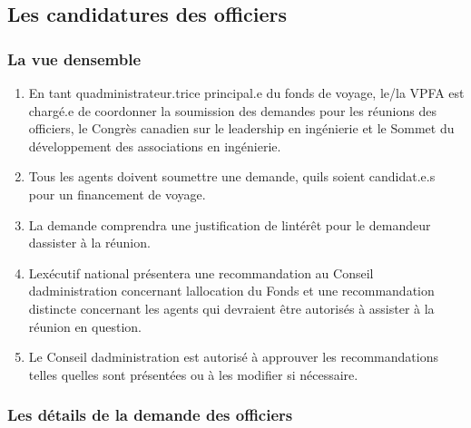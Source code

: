 \subsection{Les candidatures des officiers}
\label{les-candidatures-des-officiers}

\subsubsection{La vue d\textquotesingle ensemble}
\label{la-vue-densemble-2}

\begin{enumerate}
 \item
  En tant qu\textquotesingle administrateur.trice principal.e du fonds de voyage, le/la VPFA est chargé.e de coordonner la soumission des demandes pour les réunions des officiers, le Congrès canadien sur le leadership en ingénierie et le Sommet du développement des associations en ingénierie.
 \item
  Tous les agents doivent soumettre une demande, qu\textquotesingle ils soient candidat.e.s pour un financement de voyage.
 \item
  La demande comprendra une justification de l\textquotesingle intérêt pour le demandeur d\textquotesingle assister à la réunion.
 \item
  L\textquotesingle exécutif national présentera une recommandation au Conseil d\textquotesingle administration concernant l\textquotesingle allocation du Fonds et une recommandation distincte concernant les agents qui devraient être autorisés à assister à la réunion en question.
 \item
  Le Conseil d\textquotesingle administration est autorisé à approuver les recommandations telles qu\textquotesingle elles sont présentées ou à les modifier si nécessaire.
\end{enumerate}

\subsubsection{Les détails de la demande des officiers}
\label{les-details-de-la-demande-des-officiers}

